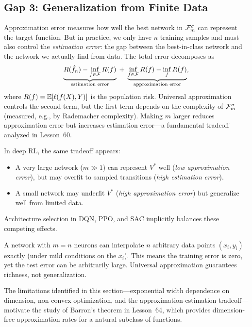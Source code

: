 \documentclass[11pt,a4paper]{article}
\begin{document}
\subsection{Gap 3: Generalization from Finite Data}
\label{sec:generalization-gap}

Approximation error measures how well the best network in
$\mathcal{F}_m^{\sigma}$ can represent the target function.  But in
practice, we only have $n$ training samples and must also control the
\emph{estimation error}: the gap between the best-in-class network and
the network we actually find from data.  The total error decomposes as
\[
  \underbrace{R(\hat{f}_n) - \inf_{f \in \mathcal{F}} R(f)}_{
    \text{estimation error}}
  \;+\;
  \underbrace{\inf_{f \in \mathcal{F}} R(f) - \inf_{f} R(f)}_{
    \text{approximation error}},
\]
where $R(f) = \mathbb{E}[\ell(f(X), Y)]$ is the population risk.  Universal
approximation controls the second term, but the first term depends on the
complexity of $\mathcal{F}_m^{\sigma}$ (measured, e.g., by Rademacher
complexity).  Making $m$ larger reduces approximation error but increases
estimation error---a fundamental tradeoff analyzed in Lesson~60.

\begin{rlconnection}[title={The Bias-Variance Tradeoff in RL}]
In deep RL, the same tradeoff appears:
\begin{itemize}[nosep]
  \item A very large network ($m \gg 1$) can represent $V^*$ well
    (\emph{low approximation error}), but may overfit to sampled
    transitions (\emph{high estimation error}).
  \item A small network may underfit $V^*$ (\emph{high approximation
    error}) but generalize well from limited data.
\end{itemize}
Architecture selection in DQN, PPO, and SAC implicitly balances these
competing effects.
\end{rlconnection}

\begin{example}
\label{ex:overfit}
A network with $m = n$ neurons can interpolate $n$ arbitrary data points
$(x_i, y_i)$ exactly (under mild conditions on the $x_i$).  This means
the training error is zero, yet the test error can be arbitrarily large.
Universal approximation guarantees richness, not generalization.
\end{example}

The limitations identified in this section---exponential width dependence
on dimension, non-convex optimization, and the approximation-estimation
tradeoff---motivate the study of Barron's theorem in Lesson~64, which
provides dimension-free approximation rates for a natural subclass of
functions.
\end{document}

